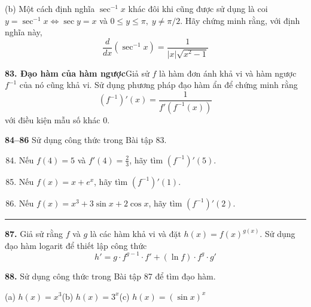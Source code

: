\hfill
\begin{minipage}[t]{0.485\textwidth}
    \noindent
    (b) Một cách định nghĩa $\sec^{-1}x$ khác đôi khi cũng được sử dụng là coi $y = \sec^{-1}x \iff \sec y = x$ và $0 \le y \le \pi,\; y \ne \pi/2$. Hãy chứng minh rằng, với định nghĩa này,
    \[
    \frac{d}{dx}(\sec^{-1}x) = \frac{1}{|x|\sqrt{x^2 - 1}}
    \]

    \noindent
    \textbf{83. Đạo hàm của hàm ngược}\quad Giả sử $f$ là hàm đơn ánh khả vi và hàm ngược $f^{-1}$ của nó cũng khả vi. Sử dụng phương pháp đạo hàm ẩn để chứng minh rằng
    \[
    (f^{-1})'(x) = \frac{1}{f'(f^{-1}(x))}
    \]
    với điều kiện mẫu số khác 0.

    \vspace{2pt}
    \noindent
    \textbf{\color{stewartcyan}84--86}\; Sử dụng công thức trong Bài tập 83.
    \begin{enumerate}[label=\textbf{\arabic*.}, leftmargin=*, itemsep=1.5pt, topsep=2pt]
        \setcounter{enumi}{83}
        \item Nếu $f(4) = 5$ và $f'(4) = \frac{2}{3}$, hãy tìm $(f^{-1})'(5)$.
        \item Nếu $f(x) = x + e^x$, hãy tìm $(f^{-1})'(1)$.
        \item Nếu $f(x) = x^3 + 3\sin x + 2\cos x$, hãy tìm $(f^{-1})'(2)$.
    \end{enumerate}

    \vspace{2pt}
    {\color{stewartcyan}\rule{\linewidth}{0.6pt}}
    \vspace{3pt}

    \noindent
    \textbf{87.}\; Giả sử rằng $f$ và $g$ là các hàm khả vi và đặt $h(x) = f(x)^{g(x)}$. Sử dụng đạo hàm logarit để thiết lập công thức
    \[
    h' = g \cdot f^{g-1} \cdot f' + (\ln f) \cdot f^g \cdot g'
    \]

    \noindent
    \textbf{88.}\; Sử dụng công thức trong Bài tập 87 để tìm đạo hàm.
    
    \vspace{2pt}
    \noindent
    (a) $h(x) = x^3$\hfill (b) $h(x) = 3^x$\hfill (c) $h(x) = (\sin x)^x$
\end{minipage}

\vspace{18pt}

